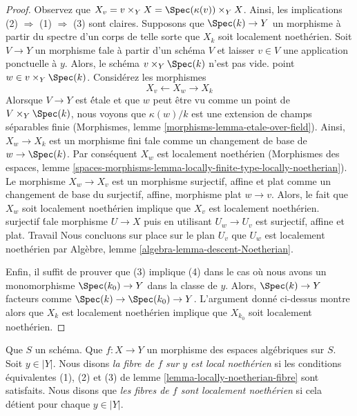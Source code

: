 \begin{proof}
Observez que $X_v = v \times_Y X = \Spec(\kappa(v)) \times_Y X$.
Ainsi, les implications (2) $\Rightarrow$ (1) $\Rightarrow$ (3) sont claires.
Supposons que $\Spec(k) \to Y$ un morphisme à partir du spectre d'un corps
de telle sorte que $X_k$ soit localement noethérien. Soit $V \to Y$ un morphisme \'tale
à partir d'un schéma $V$ et laisser $v \in V$ une application ponctuelle à $y$.
Alors, le schéma $v \times_Y \Spec(k)$ n'est pas vide.
point $w \in v \times_Y \Spec(k)$. Considérez les morphismes
$$
X_v \longleftarrow X_w \longrightarrow X_k
$$
Alorsque $V \to Y$ est \'étale et que $w$ peut être vu comme un point de
$V \times_Y \Spec(k)$, nous voyons que $\kappa(w)/k$
est une extension de champs séparables finie
(Morphismes, lemme \ref{morphisms-lemma-etale-over-field}).
Ainsi, $X_w \to X_k$ est un morphisme fini \'tale comme un changement de base de
$w \to \Spec(k)$. Par conséquent $X_w$ est localement noethérien
(Morphismes des espaces, lemme
\ref{spaces-morphisms-lemma-locally-finite-type-locally-noetherian}).
Le morphisme $X_w \to X_v$ est un morphisme surjectif, affine et plat
comme un changement de base du surjectif, affine, morphisme plat $w \to v$.
Alors, le fait que $X_w$ soit localement noethérien implique que
$X_v$ est localement noethérien.
surjectif \'tale morphisme $U \to X$ puis en utilisant
$U_w \to U_v$ est surjectif, affine et plat. Travail
Nous concluons sur place sur le plan $U_v$
que $U_w$ est localement noethérien par
Algèbre, lemme \ref{algebra-lemma-descent-Noetherian}.

\medskip\noindent
Enfin, il suffit de prouver que (3) implique (4)
dans le cas où nous avons un monomorphisme $\Spec(k_0) \to Y$ dans la classe de $y$.
Alors, $\Spec(k) \to Y$ facteurs comme $\Spec(k) \to \Spec(k_0) \to Y$.
L'argument donné ci-dessus montre alors que $X_k$ est
localement noethérien implique que $X_{k_0}$ soit localement noethérien.
\end{proof}

\begin{definition}
\label{definition-locally-Noetherian-fibre}
Que $S$ un schéma. Que $f : X \to Y$ un morphisme des espaces algébriques
sur $S$. Soit $y \in |Y|$. Nous disons {\it la fibre de $f$ sur $y$ est
local noethérien} si les conditions équivalentes (1), (2) et (3)
de lemme \ref{lemma-locally-noetherian-fibre} sont satisfaits.
Nous disons que {\it les fibres de $f$ sont localement noethérien} si cela
détient pour chaque $y \in |Y|$.
\end{definition}

